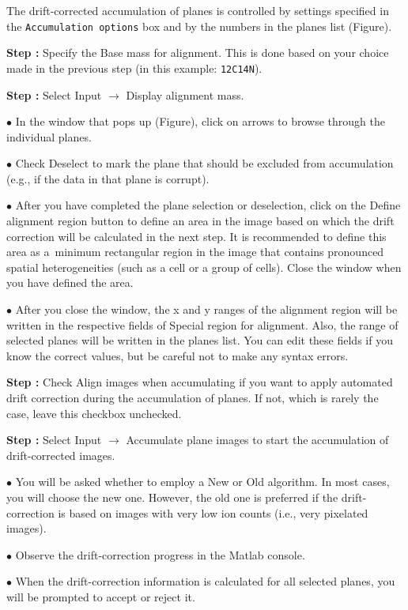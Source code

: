 \documentclass[a4paper, 11pt]{article}
\newcommand{\ttt}[1]{\texttt{#1}}
\newcommand{\lans}[1]{{\color{magenta}#1}}
\newcommand{\lanscb}[1]{{\color{darkgreen}#1}}
\newcommand{\lanstf}[1]{{\color{cyan}#1}}
\newcommand\ra{\rightarrow}
\newcounter{step}
\newcommand\s{\addtocounter{step}{1}\noindent\textbf{Step \thestep:}{ }}
\newcommand\bul{\noindent$\bullet${ }}
\begin{document}
The drift-corrected accumulation of planes is controlled by settings specified in the \ttt{Accumulation options} box and by the numbers in the \lanstf{planes} list (Figure). 

\s Specify the \lanstf{Base mass for alignment}. This is done based on your choice made in the previous step (in this example: \ttt{12C14N}). 

\s Select \lans{Input} $\ra$ \lans{Display alignment mass}. 

\bul In the window that pops up (Figure), click on \lans{arrows} to browse through the individual planes. 

\bul Check \lanscb{Deselect} to mark the plane that should be excluded from accumulation (e.g., if the data in that plane is corrupt).

\bul After you have completed the plane selection or deselection, click on the \lans{Define alignment region} button to define an area in the image based on which the drift correction will be calculated in the next step. It is recommended to define this area as a~minimum rectangular region in the image that contains pronounced spatial heterogeneities (such as a cell or a group of cells). Close the window when you have defined the area.

\bul After you close the window, the x and y ranges of the alignment region will be written in the respective fields of \lanstf{Special region for alignment}. Also, the range of selected planes will be written in the \lanstf{planes} list. You can edit these fields if you know the correct values, but be careful not to make any syntax errors. 

\s Check \lanscb{Align images when accumulating} if you want to apply automated drift correction during the accumulation of planes. If not, which is rarely the case, leave this checkbox unchecked.

\s Select \lans{Input} $\ra$ \lans{Accumulate plane images} to start the accumulation of drift-corrected images. 

\bul You will be asked whether to employ a \lans{New} or \lans{Old} algorithm. In most cases, you will choose the new one. However, the old one is preferred if the drift-correction is based on images with very low ion counts (i.e., very pixelated images).

\bul Observe the drift-correction progress in the Matlab console. 

\bul When the drift-correction information is calculated for all selected planes, you will be prompted to accept or reject it. 
\end{document}
